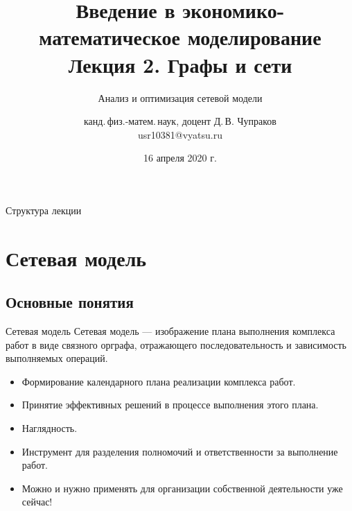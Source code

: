 \documentclass[unicode,11pt,notheorems]{beamer}
\author[Д.\,В. Чупраков]{канд.\,физ.-матем.\,наук, доцент Д.\,В. Чупраков\\[6pt] usr10381@vyatsu.ru}
\institute[ВятГУ]{ФГБОУ ВО Вятский государственный университет}
\title[Графы и сети]{
	Введение в экономико-математическое моделирование\\[12pt]
	Лекция 2. Графы и сети}
\subtitle{Анализ и оптимизация сетевой модели}
\date{16 апреля 2020 г.}
\begin{document}
\maketitle

\begin{frame}{Структура лекции}
	\tableofcontents
\end{frame}

\section{Сетевая модель}
\subsection{Основные понятия}

\begin{frame}{Сетевая модель}
	\alert{Сетевая модель} --- изображение плана выполнения комплекса работ в виде связного орграфа, отражающего последовательность и зависимость выполняемых операций.


	\begin{itemize}
	\item 
		Формирование календарного плана реализации комплекса работ.
	\item 
		Принятие эффективных решений в процессе выполнения этого плана.
	\end{itemize}

	\begin{itemize}
	\item 
		Наглядность.
	\item 
		Инструмент для разделения полномочий и ответственности за выполнение работ.
	\item 
		\alert{Можно и нужно  применять для организации собственной деятельности уже сейчас!}
	\end{itemize}

\end{frame}
\end{document}
